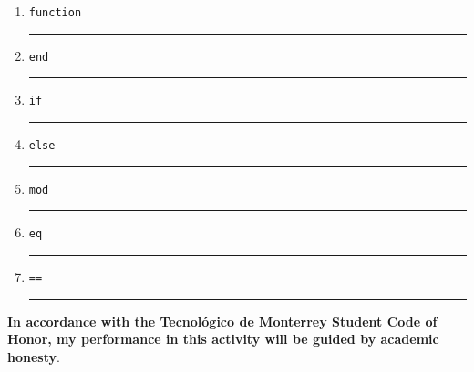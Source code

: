 \documentclass[spanish, 10pt]{article}
\newcommand{\responserule}{{\large\rule{14 cm}{0.3mm}}}
\newcommand{\matlab}[1]{\lstinline[style=Matlab-pyglike]!#1!}
\begin{document}
\begin{enumerate}[label=\alph*)]
	\large
	\item \matlab{function} \\[3ex] \responserule
	\item \matlab{end} \\[3ex] \responserule
	\item \matlab{if} \\[3ex] \responserule
	\item \matlab{else} \\[3ex] \responserule
	\item \matlab{mod} \\[3ex] \responserule
	\item \matlab{eq} \\[3ex] \responserule
	\item \matlab{==} \\[3ex] \responserule
\end{enumerate}

\vfill

\textbf{In accordance with the Tecnológico de Monterrey Student Code of Honor, my performance in this activity will be guided by academic honesty}.
\end{document}
